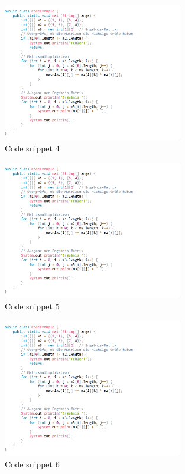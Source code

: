 \begin{figure}[H]
    \centering
    \includegraphics[width=0.7\textwidth]{figures/codeb.png}
    \caption{Code snippet 4}
    \label{fig:appendix-example}
\end{figure}

\begin{figure}[H]
    \centering
    \includegraphics[width=0.7\textwidth]{figures/codeb.png}
    \caption{Code snippet 5}
    \label{fig:appendix-example}
\end{figure}

\begin{figure}[H]
    \centering
    \includegraphics[width=0.7\textwidth]{figures/codeb.png}
    \caption{Code snippet 6}
    \label{fig:appendix-example}
\end{figure}

